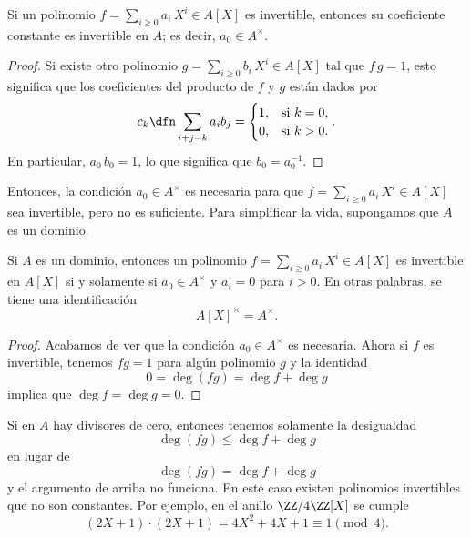 \begin{observacion}
  \label{obs:polinomios-invertibles-condicion-necesaria}
  Si un polinomio $f = \sum_{i\ge 0} a_i\,X^i \in A [X]$ es invertible, entonces
  su coeficiente constante es invertible en $A$; es decir, $a_0\in A^\times$.

  \begin{proof}
    Si existe otro polinomio $g = \sum_{i\ge 0} b_i\,X^i \in A [X]$ tal que
    $f\,g = 1$, esto significa que los coeficientes del producto de $f$ y $g$
    están dados por
    $$c_k \dfn \sum_{i+j = k} a_i b_j = \begin{cases}
      1, & \text{si } k = 0,\\
      0, & \text{si } k > 0.
    \end{cases}.$$
    En particular, $a_0\,b_0 = 1$, lo que significa que $b_0 = a_0^{-1}$.
  \end{proof}
\end{observacion}

Entonces, la condición $a_0 \in A^\times$ es necesaria para que
$f = \sum_{i\ge 0} a_i\,X^i \in A [X]$ sea invertible, pero no es
suficiente. Para simplificar la vida, supongamos que $A$ es un dominio.

\begin{proposicion}
  Si $A$ es un dominio, entonces un polinomio
  $f = \sum_{i\ge 0} a_i\,X^i \in A [X]$ es invertible en $A [X]$ si y solamente
  si $a_0 \in A^\times$ y $a_i = 0$ para $i > 0$. En otras palabras, se tiene
  una identificación
  $$A [X]^\times = A^\times.$$

  \begin{proof}
    Acabamos de ver que la condición $a_0 \in A^\times$ es necesaria. Ahora si
    $f$ es invertible, tenemos $fg = 1$ para algún polinomio $g$ y la identidad
    $$0 = \deg (fg) = \deg f + \deg g$$
    implica que $\deg f = \deg g = 0$.
  \end{proof}
\end{proposicion}

\begin{comentario}
  Si en $A$ hay divisores de cero, entonces tenemos solamente la desigualdad
  $$\deg (fg) \le \deg f + \deg g$$
  en lugar de
  $$\deg (fg) = \deg f + \deg g$$
  y el argumento de arriba no funciona. En este caso existen polinomios
  invertibles que no son constantes. Por ejemplo, en el anillo $\ZZ/4\ZZ [X]$ se
  cumple
  $$(2X + 1) \cdot (2X + 1) = 4X^2 + 4X + 1 \equiv 1 \pmod{4}.$$
\end{comentario}

